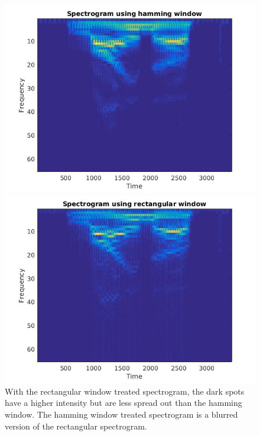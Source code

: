 \documentclass{article}
\begin{document}
\begin{figure}[H]
\includegraphics[scale = .5]{report8_1}
\includegraphics[scale = .5]{report8_2}
\\ With the rectangular window treated spectrogram, the dark spots have a higher intensity but are less spread out than the hamming window. The hamming window treated spectrogram is a blurred version of the rectangular spectrogram.
\end{figure}
\end{document}
